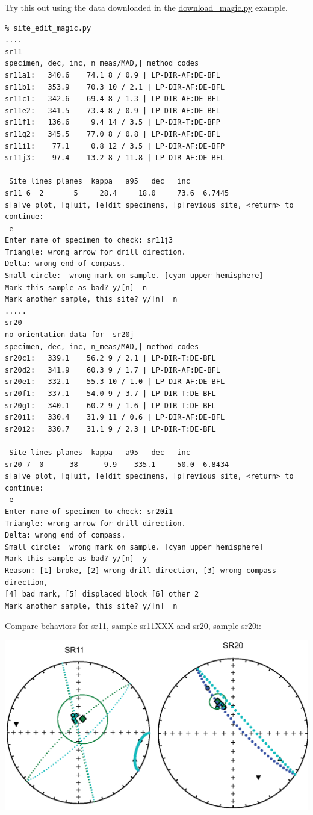 \documentclass[11pt]{book}
\begin{document}
{{Try this out using the data downloaded  in the \href{#download_magic.py}{download\_magic.py} example.  

\begin{verbatim}
% site_edit_magic.py
....
sr11
specimen, dec, inc, n_meas/MAD,| method codes 
sr11a1:   340.6    74.1 8 / 0.9 | LP-DIR-AF:DE-BFL
sr11b1:   353.9    70.3 10 / 2.1 | LP-DIR-AF:DE-BFL
sr11c1:   342.6    69.4 8 / 1.3 | LP-DIR-AF:DE-BFL
sr11e2:   341.5    73.4 8 / 0.9 | LP-DIR-AF:DE-BFL
sr11f1:   136.6     9.4 14 / 3.5 | LP-DIR-T:DE-BFP
sr11g2:   345.5    77.0 8 / 0.8 | LP-DIR-AF:DE-BFL
sr11i1:    77.1     0.8 12 / 3.5 | LP-DIR-AF:DE-BFP
sr11j3:    97.4   -13.2 8 / 11.8 | LP-DIR-AF:DE-BFL

 Site lines planes  kappa   a95   dec   inc
sr11 6  2       5     28.4     18.0     73.6  6.7445 
s[a]ve plot, [q]uit, [e]dit specimens, [p]revious site, <return> to continue:
 e
Enter name of specimen to check: sr11j3
Triangle: wrong arrow for drill direction.
Delta: wrong end of compass.
Small circle:  wrong mark on sample. [cyan upper hemisphere]
Mark this sample as bad? y/[n]  n
Mark another sample, this site? y/[n]  n
.....
sr20
no orientation data for  sr20j
specimen, dec, inc, n_meas/MAD,| method codes 
sr20c1:   339.1    56.2 9 / 2.1 | LP-DIR-T:DE-BFL
sr20d2:   341.9    60.3 9 / 1.7 | LP-DIR-AF:DE-BFL
sr20e1:   332.1    55.3 10 / 1.0 | LP-DIR-AF:DE-BFL
sr20f1:   337.1    54.0 9 / 3.7 | LP-DIR-T:DE-BFL
sr20g1:   340.1    60.2 9 / 1.6 | LP-DIR-T:DE-BFL
sr20i1:   330.4    31.9 11 / 0.6 | LP-DIR-AF:DE-BFL
sr20i2:   330.7    31.1 9 / 2.3 | LP-DIR-T:DE-BFL

 Site lines planes  kappa   a95   dec   inc
sr20 7  0      38      9.9    335.1     50.0  6.8434 
s[a]ve plot, [q]uit, [e]dit specimens, [p]revious site, <return> to continue:
 e
Enter name of specimen to check: sr20i1
Triangle: wrong arrow for drill direction.
Delta: wrong end of compass.
Small circle:  wrong mark on sample. [cyan upper hemisphere]
Mark this sample as bad? y/[n]  y
Reason: [1] broke, [2] wrong drill direction, [3] wrong compass direction, 
[4] bad mark, [5] displaced block [6] other 2
Mark another sample, this site? y/[n]  n
\end{verbatim}


Compare behaviors for sr11, sample sr11XXX and sr20, sample sr20i:

\includegraphics[width=15cm]{EPSfiles/site_edit_magic.eps}

}}
\end{document}
